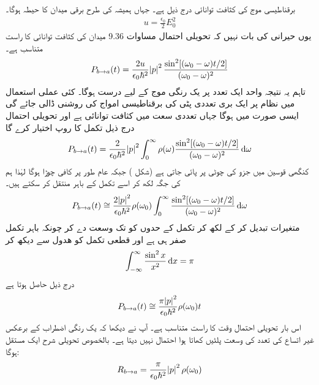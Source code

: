 برقناطیسی موج کی کثافت توانائی درج ذیل ہے۔ جہاں  ہمیشہ کی طرح برقی میدان کا حیطہ ہوگا۔
\begin{align}
	u = \frac{\epsilon_0}{2}E^2_0
\end{align}
یوں حیرانی کی بات نہیں کہ تحویلی   احتمال مساوات \num{9.36} میدان کی کثافت توانائی کا راست متناسب ہے۔
\begin{align}
	P_{b\rightarrow a }(t) = \frac{2u}{\epsilon_0\hbar^2}\abs{p}^2 \frac{\sin^2[(\omega_0-\omega)t/2]}{(\omega_0-\omega)^2}
\end{align}
تاہم یہ نتیجہ واحد ایک تعدد  پر یک رنگی موج کے لیے درست ہوگا۔ کئی عملی استعمال میں نظام پر ایک بری تعددی پٹی کی برقناطیسی امواج کی روشنی ڈالی
 جائے گی ایسی صورت میں   ہوگا جہاں  تعددی سعت   میں کثافت توانائی ہے اور تحویلی احتمال درج ذیل تکمل کا روپ اختیار کرے گا
\begin{align}
	P_{b\rightarrow a}(t) = \frac{2}{\epsilon_0\hbar^2}\abs{p}^2\int_{0}^{\infty}\rho(\omega){\frac{\sin^2[(\omega_0-\omega)t/2]}{(\omega_0-\omega)^2}}\dif \omega
\end{align}
کنگھی قوسین میں جزو کی چوٹی  پر پائی جاتی ہے   (شکل )  جبکہ عام طور پر  کافی چوڑا ہوگا لہٰذا ہم  کی جگہ  لکھ کر اسے تکمل کے باہر منتقل کر سکتے ہیں۔
\begin{align}
	P_{b\rightarrow a}(t) \cong \frac{2\abs{p}^2}{\epsilon_0\hbar^2}\rho(\omega_0)\int_{0}^{\infty}\frac{\sin^2[(\omega_0-\omega)t/2]}{(\omega_0-\omega)^2}\dif \omega
\end{align}
متغیرات تبدیل کر کے  لکھ کر تکمل کے حدوں کو  تک وسعت دے کر چونکہ باہر تکمل صفر ہی ہے اور قطعی تکمل کو ھدول سے دیکھ کر 
\begin{align}
	\int_{-\infty}^{\infty}\frac{\sin^2x}{x^2}\dif x = \pi
\end{align}
درج ذیل حاصل ہوتا ہے 
\begin{align}
	P_{b\rightarrow a}(t)\cong\frac{\pi\abs{p}^2}{\epsilon_0\hbar^2}\rho(\omega_0)t
\end{align}
اس بار تحویلی احتمال وقت  کا راست متناسب ہے۔ آپ نے دیکھا کہ یک رنگی اضطراب کے برعکس غیر اتساع کی تعدد کی وسعت پلٹیں کھاتا ہوا احتمال نہیں دیتا ہے۔ بالخصوص تحویلی شرح  ایک مستقل ہوگا:
\begin{align}
	R_{b\rightarrow a} = \frac{\pi}{\epsilon_0\hbar^2}\abs{p}^2\rho(\omega_0)
\end{align}


